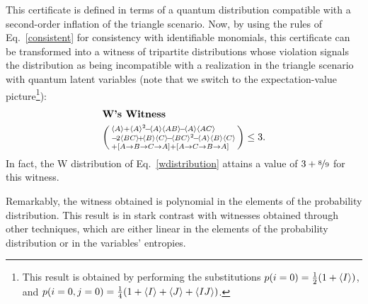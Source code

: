 \documentclass[superscriptaddress,aps,prx,nofootinbib,twocolumn,twoside,reprint,letterpaper,longbibliography]{revtex4-2}
\DeclarePairedDelimiter{\expec}{\langle}{\rangle}
\begin{document}
This certificate is defined in terms of a quantum distribution compatible with a second-order inflation of the triangle scenario.
Now, by using the rules of Eq.~\eqref{consistent} for consistency with identifiable monomials, this certificate can be transformed into a witness of tripartite distributions whose violation signals the distribution as being incompatible with a realization in the triangle scenario with quantum latent variables (note that we switch to the expectation-value picture\footnote{This result is obtained by performing the substitutions $p(i=0)=\frac{1}{2}(1+\expec*{I})$, and  $p(i=0,j=0)=\frac{1}{4}(1+\expec*{I}+\expec*{J}+\expec*{IJ})$.}):
\begin{align}
\nonumber&\textbf{W's Witness}\\
&\begin{psmallmatrix*}[l]
		\expec*{A} + \expec*{A}^2 \!-\! \expec*{A}\expec*{AB}\!-\!\expec*{A}\expec*{AC} \\
		-\! 2\expec*{BC} \!+\! \expec*{B}\expec*{C} \!-\! \expec*{BC}^2 \!-\! \expec*{A}\expec*{B}\expec*{C} \\
		 + [A\rightarrow B\rightarrow C\rightarrow A] + [A\rightarrow C\rightarrow B\rightarrow A]
		 	\end{psmallmatrix*}
\leq 3.
	\label{eq:Wwitness}
\end{align}
In fact, the W distribution of Eq.~\eqref{wdistribution} attains a value of $3+\nicefrac{8}{9}$ for this witness.

Remarkably, the witness obtained is polynomial in the elements of the probability distribution.
This result is in stark contrast with witnesses obtained through other techniques, which are either linear in the elements of the probability distribution or in the variables' entropies.
\end{document}
